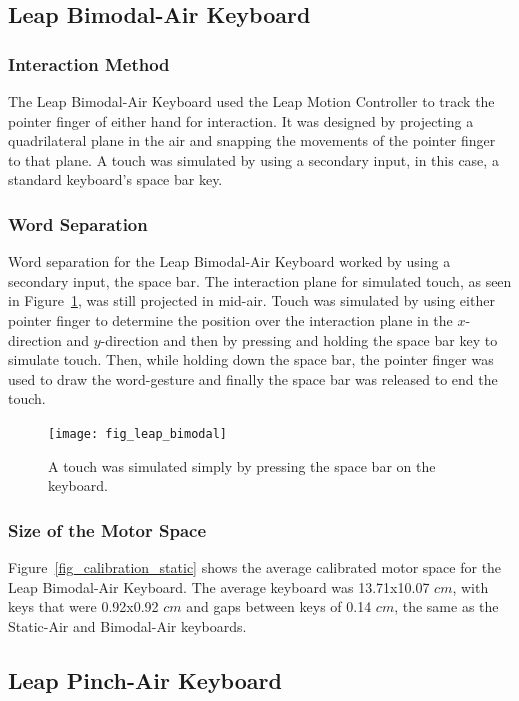 \subsection{Leap Bimodal-Air Keyboard}
\subsubsection{Interaction Method}
The Leap Bimodal-Air Keyboard used the Leap Motion Controller to track the pointer finger of either hand for interaction. It was designed by projecting a quadrilateral plane in the air and snapping the movements of the pointer finger to that plane. A touch was simulated by using a secondary input, in this case, a standard keyboard's space bar key.

\subsubsection{Word Separation}
Word separation for the Leap Bimodal-Air Keyboard worked by using a secondary input, the space bar. The interaction plane for simulated touch, as seen in Figure~\ref{bimodal_press}, was still projected in mid-air. Touch was simulated by using either pointer finger to determine the position over the interaction plane in the $x$-direction and $y$-direction and then by pressing and holding the space bar key to simulate touch. Then, while holding down the space bar, the pointer finger was used to draw the word-gesture and finally the space bar was released to end the touch.

\begin{figure}[h]
	\centering
	\texttt{[image: fig\_leap\_bimodal]}
	\caption[Leap Bimodal-Air Word-Separation]{A touch was simulated simply by pressing the space bar on the keyboard.}
	\label{bimodal_press}
\end{figure}

\subsubsection{Size of the Motor Space}
Figure~\ref{fig_calibration_static} shows the average calibrated motor space for the Leap Bimodal-Air Keyboard. The average keyboard was 13.71x10.07 $cm$, with keys that were 0.92x0.92 $cm$ and gaps between keys of 0.14 $cm$, the same as the Static-Air and Bimodal-Air keyboards.

\subsection{Leap Pinch-Air Keyboard}
